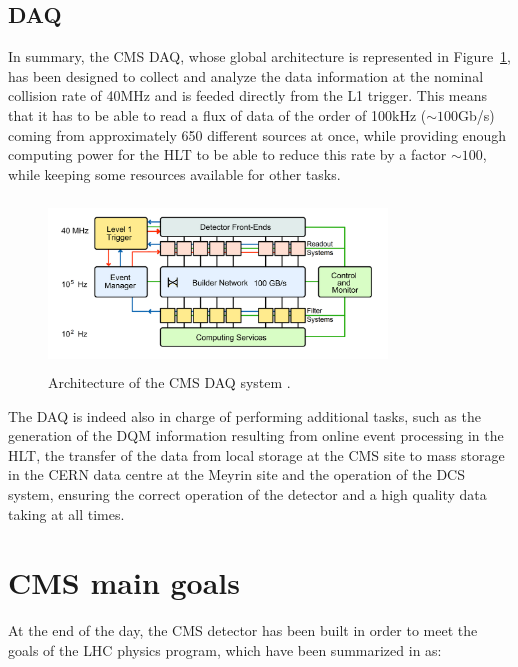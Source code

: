 \documentclass[a4paper, 10pt, openright]{report}
\begin{document}
\subsection{\acf{DAQ}} \label{subsection:DAQ}

In summary, the CMS \ac{DAQ}, whose global architecture is represented in Figure~\ref{fig:CMSDAQ}, has been designed to collect and analyze the data information at the nominal collision rate of 40MHz and is feeded directly from the \ac{L1} trigger. This means that it has to be able to read a flux of data of the order of 100kHz ($\sim 100$Gb/s) coming from approximately 650 different sources at once, while providing enough computing power for the \ac{HLT} to be able to reduce this rate by a factor $\sim 100$, while keeping some resources available for other tasks.

\begin{figure}[htbp]
\begin{center}
\includegraphics[width=9cm, height=4.5cm]{figs/CMSDAQ.png}
\caption{Architecture of the \ac{CMS} \ac{DAQ} system \cite{CMSDescription}.}
\label{fig:CMSDAQ}
\end{center}
\end{figure}

The \ac{DAQ} is indeed also in charge of performing additional tasks, such as the generation of the \ac{DQM} information resulting
from online event processing in the \ac{HLT}, the transfer of the data from local storage at the \ac{CMS} site to mass storage in the \ac{CERN} data centre at the Meyrin site and the operation of the \ac{DCS} system, ensuring the correct operation of the detector and a high quality data taking at all times. %

\section{\ac{CMS} main goals}

At the end of the day, the \ac{CMS} detector has been built in order to meet the goals of the \ac{LHC} physics program, which have been summarized in \cite{CMSDescription} as:
\end{document}
